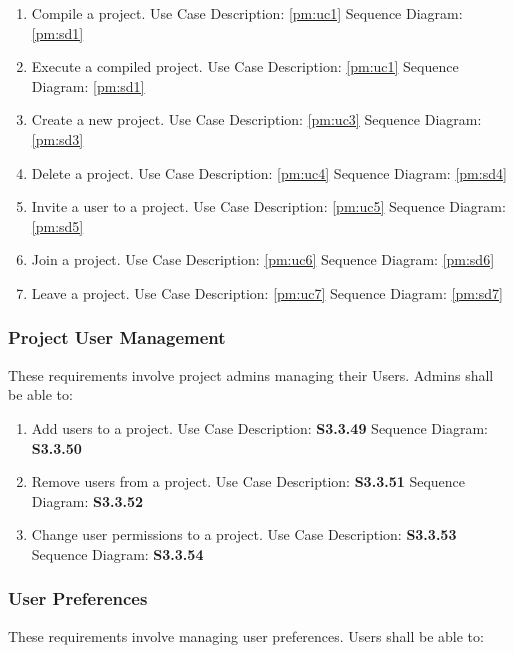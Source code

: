 \documentclass[twoside,letterpaper]{article}
\begin{document}
	\begin{enumerate}
		\item Compile a project.  
			\subitem Use Case Description: \ref{pm:uc1}
			\subitem Sequence Diagram:  \ref{pm:sd1}
		\item Execute a compiled project. 
			\subitem Use Case Description: \ref{pm:uc1}
			\subitem Sequence Diagram:  \ref{pm:sd1}
		\item Create a new project. 
			\subitem Use Case Description: \ref{pm:uc3}
			\subitem Sequence Diagram:  \ref{pm:sd3}
		\item Delete a project. 
			\subitem Use Case Description: \ref{pm:uc4}
			\subitem Sequence Diagram:  \ref{pm:sd4}
		\item Invite a user to a project. 	
			\subitem Use Case Description: \ref{pm:uc5}
			\subitem Sequence Diagram:  \ref{pm:sd5}
		\item Join a project. 
			\subitem Use Case Description: \ref{pm:uc6}
			\subitem Sequence Diagram:  \ref{pm:sd6}
		\item Leave a project.
			\subitem Use Case Description: \ref{pm:uc7}
			\subitem Sequence Diagram:  \ref{pm:sd7}
	\end{enumerate}
	
	\subsubsection{Project User Management}
	
	These requirements involve project admins managing their Users. Admins shall be able to:
	
	\begin{enumerate}
		\item Add users to a project.
	    \subitem Use Case Description: \textbf{S3.3.49}
			\subitem Sequence Diagram: \textbf{S3.3.50}
	  \item Remove users from a project.
	    \subitem Use Case Description: \textbf{S3.3.51}
			\subitem Sequence Diagram: \textbf{S3.3.52}
		\item Change user permissions to a project.
	    \subitem Use Case Description: \textbf{S3.3.53}
			\subitem Sequence Diagram: \textbf{S3.3.54}
	\end{enumerate}
	
	\subsubsection{User Preferences}
	
	These requirements involve managing user preferences. Users shall be able to:
	
\end{document}
